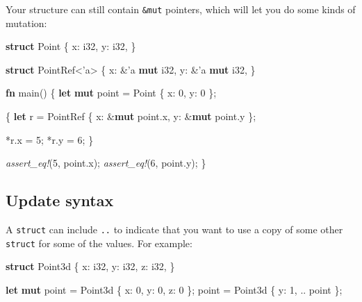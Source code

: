 \documentclass[a4paper,]{book}
\newenvironment{Shaded}{\begin{snugshade}}{\end{snugshade}}
\newcommand{\KeywordTok}[1]{\textcolor[rgb]{0.13,0.29,0.53}{\textbf{{#1}}}}
\newcommand{\DataTypeTok}[1]{\textcolor[rgb]{0.13,0.29,0.53}{{#1}}}
\newcommand{\DecValTok}[1]{\textcolor[rgb]{0.00,0.00,0.81}{{#1}}}
\newcommand{\OtherTok}[1]{\textcolor[rgb]{0.56,0.35,0.01}{{#1}}}
\newcommand{\PreprocessorTok}[1]{\textcolor[rgb]{0.56,0.35,0.01}{\textit{{#1}}}}
\newcommand{\NormalTok}[1]{{#1}}
\begin{document}
Your structure can still contain \texttt{\&mut} pointers, which will let
you do some kinds of mutation:

\begin{Shaded}
\begin{Highlighting}[]
\KeywordTok{struct} \NormalTok{Point \{}
    \NormalTok{x: }\DataTypeTok{i32}\NormalTok{,}
    \NormalTok{y: }\DataTypeTok{i32}\NormalTok{,}
\NormalTok{\}}

\KeywordTok{struct} \NormalTok{PointRef<}\OtherTok{'a}\NormalTok{> \{}
    \NormalTok{x: &}\OtherTok{'a} \KeywordTok{mut} \DataTypeTok{i32}\NormalTok{,}
    \NormalTok{y: &}\OtherTok{'a} \KeywordTok{mut} \DataTypeTok{i32}\NormalTok{,}
\NormalTok{\}}

\KeywordTok{fn} \NormalTok{main() \{}
    \KeywordTok{let} \KeywordTok{mut} \NormalTok{point = Point \{ x: }\DecValTok{0}\NormalTok{, y: }\DecValTok{0} \NormalTok{\};}

    \NormalTok{\{}
        \KeywordTok{let} \NormalTok{r = PointRef \{ x: &}\KeywordTok{mut} \NormalTok{point.x, y: &}\KeywordTok{mut} \NormalTok{point.y \};}

        \NormalTok{*r.x = }\DecValTok{5}\NormalTok{;}
        \NormalTok{*r.y = }\DecValTok{6}\NormalTok{;}
    \NormalTok{\}}

    \PreprocessorTok{assert_eq!}\NormalTok{(}\DecValTok{5}\NormalTok{, point.x);}
    \PreprocessorTok{assert_eq!}\NormalTok{(}\DecValTok{6}\NormalTok{, point.y);}
\NormalTok{\}}
\end{Highlighting}
\end{Shaded}

\subsection{Update syntax}\label{update-syntax}

A \texttt{struct} can include \texttt{..} to indicate that you want to
use a copy of some other \texttt{struct} for some of the values. For
example:

\begin{Shaded}
\begin{Highlighting}[]
\KeywordTok{struct} \NormalTok{Point3d \{}
    \NormalTok{x: }\DataTypeTok{i32}\NormalTok{,}
    \NormalTok{y: }\DataTypeTok{i32}\NormalTok{,}
    \NormalTok{z: }\DataTypeTok{i32}\NormalTok{,}
\NormalTok{\}}

\KeywordTok{let} \KeywordTok{mut} \NormalTok{point = Point3d \{ x: }\DecValTok{0}\NormalTok{, y: }\DecValTok{0}\NormalTok{, z: }\DecValTok{0} \NormalTok{\};}
\NormalTok{point = Point3d \{ y: }\DecValTok{1}\NormalTok{, .. point \};}
\end{Highlighting}
\end{Shaded}
\end{document}
